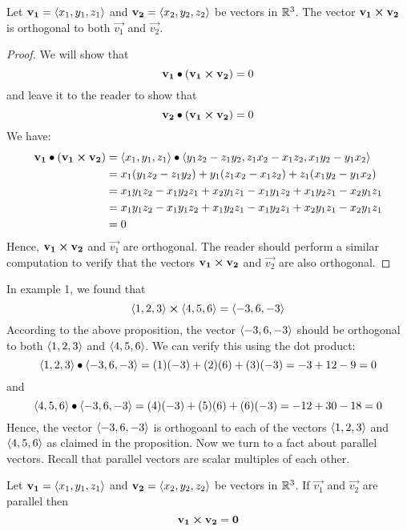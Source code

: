 \documentclass[handout]{ximera}
\begin{document}
\begin{proposition}[Orthogonality] 
Let  $\mathbf{v_1} = \left\langle x_1, y_1, z_1\right\rangle$ and $\mathbf{v_2} = \left\langle x_2, y_2, z_2\right\rangle$ be vectors in $\mathbb R^3$. 
The vector $\mathbf{v_1}\boldsymbol\times \mathbf{v_2}$ is orthogonal to both $\vec{v_1}$ and $\vec{v_2}$. 
\end{proposition}
\begin{proof} We will show that 
\[
 \mathbf{v_1} \bullet \left(\mathbf{v_1} \boldsymbol\times \mathbf{v_2} \right) = 0
\]
and leave it to the reader to show that
\[
\mathbf{v_2} \bullet \left(\mathbf{v_1} \boldsymbol\times \mathbf{v_2} \right) = 0
\]
We have:
\begin{align*}
\mathbf{v_1} \bullet \left(\mathbf{v_1} \boldsymbol\times \mathbf{v_2} \right)  
                            &= \left\langle x_1, y_1, z_1\right\rangle\bullet \left\langle y_1z_2 - z_1y_2, z_1x_2 - x_1z_2, x_1y_2 - y_1x_2\right\rangle \\
                                                &= x_1(y_1z_2 - z_1y_2) + y_1(z_1x_2 - x_1z_2) + z_1(x_1y_2 - y_1x_2)\\
                                                &= x_1y_1z_2 - x_1y_2z_1 + x_2y_1z_1 - x_1y_1z_2 + x_1y_2z_1 - x_2y_1z_1\\
                                                &= x_1y_1z_2 - x_1y_1z_2 + x_1y_2z_1 - x_1y_2z_1 + x_2y_1z_1 - x_2y_1z_1\\
                                                &= 0
\end{align*}
Hence, $\mathbf{v_1} \boldsymbol\times \mathbf{v_2}$ and $\vec{v_1}$ are orthogonal.  
The reader should perform a similar computation to verify that the vectors
$\mathbf{v_1} \boldsymbol\times \mathbf{v_2}$ and $\vec{v_2}$ are also orthogonal.
\end{proof}
In example 1, we found that
\[
\left\langle 1, 2, 3\right\rangle \boldsymbol\times \left\langle 4, 5, 6\right\rangle = \left\langle -3, 6, -3\right\rangle
\]
According to the above proposition, the vector $\left\langle -3, 6, -3\right\rangle$ should be orthogonal to both $\left\langle 1, 2, 3\right\rangle$ and $\left\langle 4, 5, 6\right\rangle$.
We can verify this using the dot product:
\[
\left\langle 1, 2, 3\right\rangle \bullet \left\langle -3, 6, -3\right\rangle = (1)(-3) +(2)(6)+(3)(-3) = -3+12-9 = 0
\]
and
\[
\left\langle 4, 5, 6\right\rangle \bullet \left\langle -3, 6, -3\right\rangle = (4)(-3) +(5)(6)+(6)(-3) = -12 + 30 -18 = 0
\]
Hence, the vector $\left\langle -3, 6, -3\right\rangle$ is orthogoanl to each of the vectors $\left\langle 1, 2, 3\right\rangle$ and $\left\langle 4, 5, 6\right\rangle$ as claimed in the proposition.
Now we turn to a fact about parallel vectors.
Recall that parallel vectors are scalar multiples of each other.
\begin{proposition}
Let  $\mathbf{v_1} = \left\langle x_1, y_1, z_1\right\rangle$ and $\mathbf{v_2} = \left\langle x_2, y_2, z_2\right\rangle$ be vectors in $\mathbb R^3$.
If $\vec{v_1}$ and $\vec{v_2}$ are parallel then 
\[
\mathbf{v_1} \boldsymbol\times \mathbf{v_2} = \mathbf 0
\]
\end{proposition}
\end{document}
